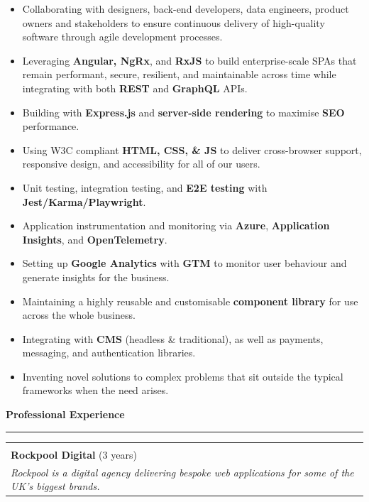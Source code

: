 \documentclass[letterpaper,11pt]{article}
\newcommand{\resheading}[1]{
  {
    \flushleft
    {\Large \textbf{#1}}
    \vspace{-6pt}
    \par\noindent\rule{\textwidth}{0.4pt}
    \vspace{2pt}
  }
}
\begin{document}
{\small
  
  \begin{itemize}
    \item Collaborating with designers, back-end developers, data engineers, product owners and stakeholders to ensure continuous delivery of high-quality software through agile development processes.
   \item Leveraging \textbf{Angular, NgRx}, and \textbf{RxJS} to build enterprise-scale SPAs that remain performant, secure, resilient, and maintainable across time while integrating with both \textbf{REST} and \textbf{GraphQL} APIs.
     \item Building with \textbf{Express.js} and \textbf{server-side rendering} to maximise \textbf{SEO} performance.
  \item Using W3C compliant \textbf{HTML, CSS, \& JS} to deliver cross-browser support, responsive design, and accessibility for all of our users.
  \item Unit testing, integration testing, and \textbf{E2E testing} with \textbf{Jest/Karma/Playwright}.
  \item Application instrumentation and monitoring via \textbf{Azure}, \textbf{Application Insights}, and \textbf{OpenTelemetry}.
  \item Setting up \textbf{Google Analytics} with \textbf{GTM} to monitor user behaviour and generate insights for the business.
  \item Maintaining a highly reusable and customisable \textbf{component library} for use across the whole business.
  \item Integrating with \textbf{CMS} (headless \& traditional), as well as payments, messaging, and authentication libraries.
   \item Inventing novel solutions to complex problems that sit outside the typical frameworks when the need arises.
    
\end{itemize}

}

\vspace{-4pt}

\resheading{Professional Experience}

\centering

\def\arraystretch{1.2}

\begin{tabular*}{6.6in}{p{0.1in}p{6.4in}p{0.1in}}

  
  \multicolumn{3}{l}{\vspace{-24pt}}\\

  \multicolumn{3}{l}{\textbf{\large Rockpool Digital} {\small (3 years)}}\\
  \multicolumn{3}{l}{\small {\it Rockpool is a digital agency delivering bespoke web applications for some of the UK's biggest brands.}\vspace{4pt}}\\

\end{tabular*}
\end{document}
